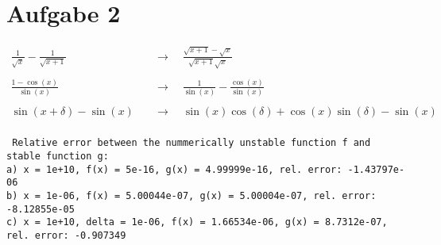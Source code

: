 \section{Aufgabe 2} \label{sec:A2}

\begin{align*}
    \frac{1}{\sqrt{x}} - \frac{1}{\sqrt{x+1}}
        &\quad\longrightarrow\quad
    \frac{\sqrt{x + 1} - \sqrt{x}}{\sqrt{x + 1} \sqrt{x}} \\
    \\
    \frac{1 - \cos(x)}{\sin(x)}
        &\quad\longrightarrow\quad
    \frac{1}{\sin(x)} - \frac{\cos(x)}{\sin(x)} \\
    \\
    \sin(x + \delta) - \sin(x)
        &\quad\longrightarrow\quad
    \sin(x) \cos(\delta) + \cos(x) \sin(\delta) - \sin(x) \\
\end{align*}

\texttt{
    \scriptsize
    Relative error between the nummerically unstable function f and stable function g: \\
    a) x = 1e+10, f(x) = 5e-16, g(x) = 4.99999e-16, rel. error: -1.43797e-06 \\
    b) x = 1e-06, f(x) = 5.00044e-07, g(x) = 5.00004e-07, rel. error: -8.12855e-05 \\
    c) x = 1e+10, delta = 1e-06, f(x) = 1.66534e-06, g(x) = 8.7312e-07, rel. error: -0.907349 \\
}
